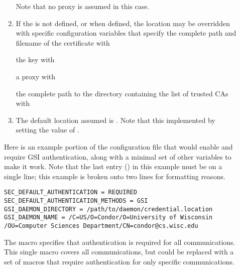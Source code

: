 \begin{description}
\begin{enumerate}
\normalsize
Note that no proxy is assumed in this case.
\item
If the  is not defined, 
or when defined,
the location may be overridden with specific configuration
variables that specify the complete path and filename of 
the certificate with
the key with
a proxy with
the complete path to the directory containing the list of trusted CAs with 
\item
The default location assumed is .
Note that this implemented by setting the value of  
.
\end{enumerate}

Here is an example portion of the configuration file that would
enable and require GSI authentication,
along with a minimal set of other variables to make it work. 
Note that the last entry () in this example
must be on a single line;
this example is broken onto two lines for formatting reasons.

\footnotesize
\begin{verbatim}
SEC_DEFAULT_AUTHENTICATION = REQUIRED
SEC_DEFAULT_AUTHENTICATION_METHODS = GSI
GSI_DAEMON_DIRECTORY = /path/to/daemon/credential.location
GSI_DAEMON_NAME = /C=US/O=Condor/O=University of Wisconsin
/OU=Computer Sciences Department/CN=condor@cs.wisc.edu
\end{verbatim}
\normalsize

The
 macro specifies that
authentication is required for all communications.
This single macro covers all communications, but could be
replaced with a set of macros that require authentication for
only specific communications.


\end{description}

